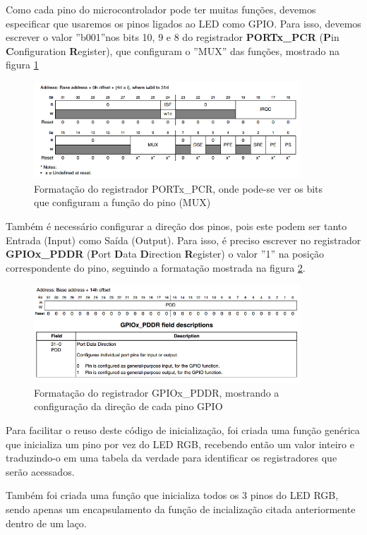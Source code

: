 \documentclass{article}
\begin{document}
Como cada pino do microcontrolador pode ter muitas funções, devemos especificar que usaremos os pinos ligados ao LED como GPIO. Para isso, devemos escrever o valor ''b001''nos bits 10, 9 e 8 do registrador \textbf{PORTx\_PCR} (\textbf{P}in \textbf{C}onfiguration \textbf{R}egister), que configuram o ''MUX'' das funções, mostrado na figura \ref{pcr}

\begin{figure}[ht!]
\centering
\includegraphics[width=100mm]{pcr.png}
\caption{Formatação do registrador PORTx\_PCR, onde pode-se ver os bits que configuram a função do pino (MUX)  \label{pcr}}
\end{figure}

Também é necessário configurar a direção dos pinos, pois este podem ser tanto Entrada (Input) como Saída (Output). Para isso, é preciso escrever no registrador \textbf{GPIOx\_PDDR} (\textbf{P}ort \textbf{D}ata \textbf{D}irection \textbf{R}egister) o valor ''1'' na posição correspondente do pino, seguindo a formatação mostrada na figura \ref{pddr}.

\begin{figure}[ht!]
\centering
\includegraphics[width=100mm]{pddr.png}
\caption{Formatação do registrador GPIOx\_PDDR, mostrando a configuração da direção de cada pino GPIO  \label{pddr}}
\end{figure}

Para facilitar o reuso deste código de inicialização, foi criada uma função genérica que inicializa um pino por vez do LED RGB, recebendo então um valor inteiro e traduzindo-o em uma tabela da verdade para identificar os registradores que serão acessados.

Também foi criada uma função que inicializa todos os 3 pinos do LED RGB, sendo apenas um encapsulamento da função de incialização citada anteriormente dentro de um laço.
\end{document}

